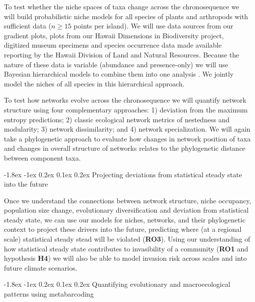 \documentclass[11pt]{article}
\makeatletter
\renewcommand\subsubsection{\@startsection{subsection}{1}{\z@}%
                                  {-1.8ex \@plus -1ex \@minus 0.2ex}%
                                  {0.1ex \@plus 0.2ex}%
                                  {\normalfont\bfseries}}
\makeatother
\begin{document}
To test whether the niche spaces of taxa change across the
chronosequence we will build probabilistic niche models for all
species of plants and arthropods with sufficient data ($n \geq 15$
points per island).  We will use data sources from our gradient plots,
plots from our Hawaii Dimensions in Biodiversity project, digitized
museum specimens and species occurrence data made available reporting
by the Hawaii Division of Land and Natural Resources.  Because the
nature of these data is variable (abundance and presence-only) we will
use Bayesian hierarchical models to combine them into one analysis
\citep{hsdm}.  We jointly model the niches of all species in this
hierarchical approach.

To test how networks evolve across the chronosequence we will quantify
network structure using four complementary approaches: 1) deviation
from the maximum entropy predictions; 2) classic ecological network
metrics of nestedness and modularity; 3) network dissimilarity; and 4)
network specialization.  We will again take a phylogenetic approach to
evaluate how changes in network position of taxa and changes in
overall structure of networks relates to the phylogenetic distance
between component taxa.


\subsubsection{Projecting deviations from statistical steady state
  into the future}

Once we understand the connections between network structure, niche
occupancy, population size change, evolutionary diversification and
deviation from statistical steady state, we can use our models for
niches, networks, and their phylogenetic context to project these
drivers into the future, predicting where (at a regional scale)
statistical steady stead will be violated ({\bf RO3}).  Using our
understanding of how statistical steady state contributes to
invasibility of a community ({\bf RO1} and hypothesis {\bf H4}) we
will also be able to model invasion risk across scales and into future
climate scenarios.

\subsubsection{Quantifying evolutionary and macroecological patterns
  using metabarcoding}
\end{document}
